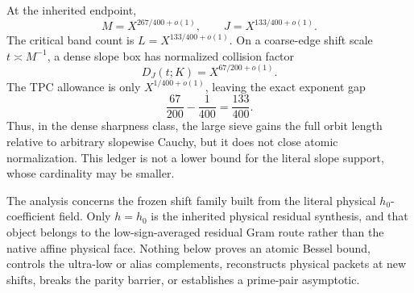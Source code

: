 At the inherited endpoint,
\begin{equation}
 M=X^{267/400+o(1)},
 \qquad
 J=X^{133/400+o(1)}.
 \label{eq:tpc48-intro-endpoint}
\end{equation}
The critical band count is \(L=X^{133/400+o(1)}\).  On a coarse-edge
shift scale \(t\asymp M^{-1}\), a dense slope box has normalized
collision factor
\begin{equation}
 D_J(t;K)=X^{67/200+o(1)}.
 \label{eq:tpc48-intro-critical-load}
\end{equation}
The TPC allowance is only \(X^{1/400+o(1)}\), leaving the exact exponent
gap
\begin{equation}
 \frac{67}{200}-\frac1{400}=\frac{133}{400}.
 \label{eq:tpc48-intro-allowance-gap}
\end{equation}
Thus, in the dense sharpness class, the large sieve gains the full
orbit length relative to arbitrary slopewise Cauchy, but it does not
close atomic normalization.  This ledger is not a lower bound for the
literal slope support, whose cardinality may be smaller.

The analysis concerns the frozen shift family built from the literal
physical \(h_0\)-coefficient field.  Only \(h=h_0\) is the inherited
physical residual synthesis, and that object belongs to the
low-sign-averaged residual Gram route rather than the native affine
physical face.  Nothing below proves an atomic Bessel bound, controls
the ultra-low or alias complements, reconstructs physical packets at
new shifts, breaks the parity barrier, or establishes a prime-pair
asymptotic.
